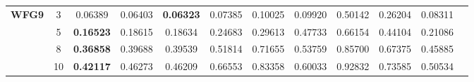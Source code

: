 \documentclass{sig-alternate}
\begin{document}
\begin{table}[!htb]
\begin{tabular}{|c|c|c|c|c|c|c|c|c|c|c|c|}
		\multirow{4}{*}{\textbf{WFG9}}  & 3          & 0.06389          & 0.06403           & \textbf{0.06323}      & 0.07385          & 0.10025             & 0.09920             & 0.50142            & 0.26204              & 0.08311          \\ \cline{2-11} 
		& 5          & \textbf{0.16523} & 0.18615           & 0.18634               & 0.24683          & 0.29613             & 0.47733             & 0.66154            & 0.44104              & 0.21086          \\ \cline{2-11} 
		& 8          & \textbf{0.36858} & 0.39688           & 0.39539               & 0.51814          & 0.71655             & 0.53759             & 0.85700            & 0.67375              & 0.45885          \\ \cline{2-11} 
		& 10         & \textbf{0.42117} & 0.46273           & 0.46209               & 0.66553          & 0.83358             & 0.60033             & 0.92832            & 0.73585              & 0.50534          \\ \hline
	\end{tabular}
\end{table}
\end{document}
